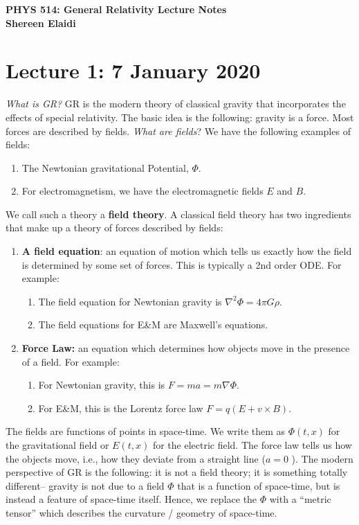 \documentclass[11pt]{article}
\theoremstyle{definition}
\begin{document}
\begin{center}
	\textbf{PHYS 514: General Relativity Lecture Notes} \\
	\textbf{Shereen Elaidi}
\end{center}
\tableofcontents

\section{Lecture 1: 7 January 2020}
\emph{What is GR?} GR is the modern theory of classical gravity that incorporates the effects of special relativity. The basic idea is the following: gravity is a force. Most forces are described by fields. \emph{What are fields}? We have the following examples of fields: 
\begin{enumerate}[noitemsep]
	\item The Newtonian gravitational Potential, \( \Phi \). 
	\item For electromagnetism, we have the electromagnetic fields \(  E \) and \( B \). 
\end{enumerate}
We call such a theory a \textbf{field theory}. A classical field theory has two ingredients that make up a theory of forces described by fields: 
\begin{enumerate}[noitemsep]
	\item \textbf{A field equation}: an equation of motion which tells us exactly how the field is determined by some set of forces. This is typically a 2nd order ODE. For example: 
	\begin{enumerate}[noitemsep]
		\item The field equation for Newtonian gravity is \( \nabla^2 \Phi = 4 \pi G \rho \). 
		\item The field equations for E\&M are Maxwell's equations. 
	\end{enumerate}
	\item \textbf{Force Law:} an equation which determines how objects move in the presence of a field. For example: 
	\begin{enumerate}[noitemsep]
		\item For Newtonian gravity, this is \( F = ma = m \nabla \Phi \).
		\item For E\&M, this is the Lorentz force law \( F = q(E + v \times B ) \).
	\end{enumerate}
\end{enumerate}
The fields are functions of points in space-time. We write them as \( \Phi(t,x) \) for the gravitational field or \( E(t,x) \) for the electric field. The force law tells us how the objects move, i.e., how they deviate from a straight line (\( a = 0 \) ). The modern perspective of GR is the following: it is not a field theory; it is something totally different-- gravity is not due to a field \( \Phi \) that is a function of space-time, but is instead a feature of space-time itself. Hence, we replace the \( \Phi \) with a ``metric tensor'' which describes the curvature / geometry of space-time. 
\end{document}
